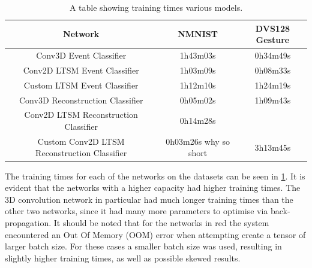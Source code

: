 \begin{table}[htb]
    \centering
    \begin{tabular}{|| c | c | c ||}
        \hline
        Network     & NMNIST & DVS128 Gesture \\
        \hline \hline
        Conv3D Event Classifier          & 1h43m03s   &   0h34m49s    \\
        \hline
        Conv2D LTSM Event Classifier         & 1h03m09s   &    0h08m33s    \\
        \hline
        Custom LTSM Event Classifier         &  1h12m10s  &    \color{red} 1h24m19s \color{black}    \\
        \hline
        Conv3D Reconstruction Classifier        &  0h05m02s    &    1h09m43s  \\
        \hline
        Conv2D LTSM Reconstruction Classifier        &  0h14m28s    &      \\
        \hline
        Custom Conv2D LTSM Reconstruction Classifier         &  0h03m26s \color{red} why so short \color{black}  &    3h13m45s   \\
        \hline
    \end{tabular}
    \caption{A table showing training times various models.}
    \label{tab:network_training_times}
\end{table}


The training times for each of the networks on the datasets can be seen in \cref{tab:network_training_times}. It is evident that the networks with a higher capacity had higher training times. The 3D convolution network in particular had much longer training times than the other two networks, since it had many more parameters to optimise via back-propagation. It should be noted that for the networks in \color{red} red \color{black} the system encountered an Out Of Memory (OOM) error when attempting create a tensor of larger batch size. For these cases a smaller batch size was used, resulting in slightly higher training times, as well as possible skewed results.